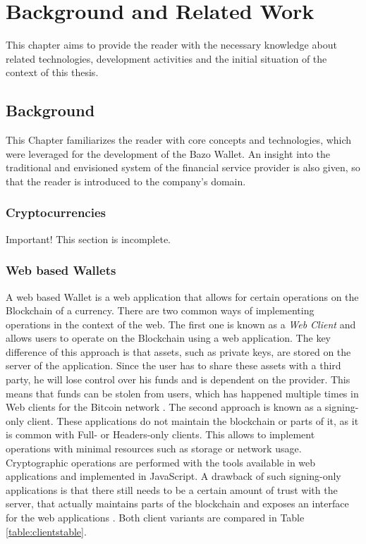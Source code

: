 \chapter{Background and Related Work}
This chapter aims to provide the reader with the necessary knowledge about related technologies, development activities and the initial situation of the context of this thesis. 
\section{Background}
This Chapter familiarizes the reader with core concepts and technologies, which were leveraged for the development of the Bazo Wallet. An insight into the traditional and envisioned system of the financial service provider is also given, so that the reader is introduced to the company's domain.
\subsection{Cryptocurrencies}
\begin{bclogo}[logo=\bcattention, couleurBarre=red, noborder=true, 
               couleur=LightSalmon]{Important!}
This section is incomplete.
\end{bclogo}
\subsection{Web based Wallets}
A web based Wallet is a web application that allows for certain operations on the Blockchain of a currency. There are two common ways of implementing operations in the context of the web.
The first one is known as a \textit{Web Client} and allows users to operate on the Blockchain using a web application. The key difference of this approach is that assets, such as private keys, are stored on the server of the application. Since the user has to share these assets with a third party, he will lose control over his funds and is dependent on the provider. This means that funds can be stolen from users, which has happened multiple times in Web clients for the Bitcoin network \cite{masteringbitcoin}.
The second approach is known as a signing-only client. These applications do not maintain the blockchain or parts of it, as it is common with Full- or Headers-only clients. This allows to implement operations with minimal resources such as storage or network usage. Cryptographic operations are performed with the tools available in web applications and implemented in JavaScript.
A drawback of such signing-only applications is that there still needs to be a certain amount of trust with the server, that actually maintains parts of the blockchain and exposes an interface for the web applications \cite{bitcoinclients}.
Both client variants are compared in Table \ref{table:clientstable}.
